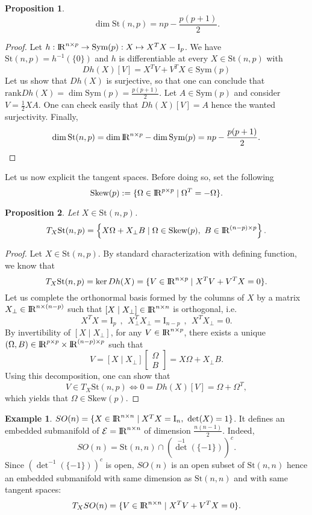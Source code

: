 \documentclass[10pt,a4paper]{book}
\theoremstyle{definition}
\newtheorem{exm}{Example}[section]
\theoremstyle{plain}
\newtheorem{prop}{Proposition}[section]
\theoremstyle{remark}
\newcommand{\E}{\mathcal{E}}
\newcommand \Stif {\textrm{St}}
\def\R{{\rm I\kern-0.16em R}}
\def\B{{\rm I\kern-0.16em B}}
\begin{document}
\begin{prop}
$$\dim \Stif(n,p)=np-\frac{p(p+1)}{2}.$$
\end{prop}
\begin{proof}
Let $h: \R^{n\times p} \to \text{Sym}(p): X\mapsto X^{T}X-\text{I}_p$. We have $\Stif(n,p)=h^{-1}(\{0\})$ and $h$ is differentiable at every $X \in \Stif(n,p)$ with
$$Dh(X)[V]=X^{T}V+V^{T}X \in \text{Sym}(p)$$
Let us show that $Dh(X)$ is surjective, so that one can conclude that $\text{rank}Dh(X)=\dim \text{Sym}(p)=\frac{p(p+1)}{2}$.
Let $A\in \text{Sym}(p)$ and consider $V=\frac{1}{2}XA$. One can check easily that $Dh(X)[V]=A$ hence the wanted surjectivity. Finally,
$$\dim \Stif(n,p)=\dim \R^{n\times p}-\dim \text{Sym}(p)=np-\frac{p(p+1)}{2}.$$
\end{proof}
Let us now explicit the tangent spaces. Before doing so, set the following
$$\text{Skew}(p):=\{\Omega \in \R^{p\times p} \mid \Omega^{T}=-\Omega\}.$$
\begin{prop}
Let $X\in \Stif(n,p)$. 
$$T_X\Stif(n,p)=\left\{X\Omega +X_{\bot}B \mid \Omega \in \text{Skew}(p), ~B \in \R^{(n-p)\times p} \right\}.$$
\end{prop}
\begin{proof}
Let $X\in \Stif(n,p)$. By standard characterization with defining function, we know that
$$T_X\Stif(n,p)=\ker Dh(X)=\{V\in \R^{n\times p} \mid X^{T}V+V^{T}X=0\}.$$
Let us complete the orthonormal basis formed by the columns of $X$ by a matrix $X_{\bot} \in \R^{n\times(n-p)}$ such that $[X \mid X_{\bot}]\in \R^{n\times n}$ is orthogonal, i.e.
$$X^{T}X=\text{I}_p~~,~~X^{T}_{\bot}X_{\bot}=\text{I}_{n-p}~~,~~X^{T}X_{\bot}=0.$$
By invertibility of $[X \mid X_{\bot}]$, for any $V\in \R^{n\times p}$, there exists a unique $(\Omega,B)\in \R^{p\times p}\times \R^{(n-p)\times p}$ such that
$$V=[X \mid X_{\bot}]\left[\begin{array}{c}\Omega \\B\end{array}\right]=X\Omega+X_{\bot}B.$$ Using this decomposition, one can show that
$$V\in T_X\Stif(n,p)\iff 0=Dh(X)[V]=\Omega+\Omega^{T},$$
which yields that $\Omega \in \text{Skew}(p)$.
\end{proof}
\begin{exm}
$SO(n)=\{X\in \R^{n\times n} \mid X^{T}X=\text{I}_n,~\det(X)=1\}$. It defines an embedded submanifold of $\E=\R^{n\times n}$ of dimension $\frac{n(n-1)}{2}$. Indeed, 
$$SO(n)=\text{St}(n,n)\cap(\det^{-1}(\{-1\}))^{c}.$$
Since $(\det^{-1}(\{-1\}))^{c}$ is open, $SO(n)$ is an open subset of $\text{St}(n,n)$ hence an embedded submanifold with same dimension as $\text{St}(n,n)$ and with same tangent spaces:
$$T_XSO(n)=\{V\in \R^{n\times n} \mid X^{T}V+V^{T}X=0\}.$$
\end{exm}
\end{document}

